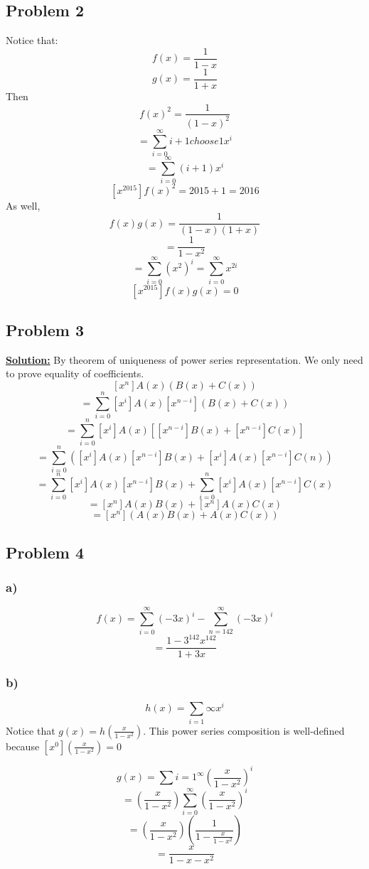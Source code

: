 \documentclass[12pt]{article}
\newcommand{\myt}[1]{\textbf{\underline{#1}}}
\begin{document}
	\subsection*{Problem 2}
	
	Notice that:
	$$f(x) = \frac{1}{1-x}$$
	$$g(x) = \frac{1}{1+x}$$
	Then 
	$$f(x)^2 = \frac{1}{(1-x)^2}$$
	$$= \sum_{i=0}^{\infty}{i+1 choose 1}x^i$$
	$$= \sum_{i=0}^{\infty}(i+1)x^i$$
	$$[x^{2015}]f(x)^2=2015+1 = 2016$$
	As well,
	$$f(x)g(x) = \frac{1}{(1-x)(1+x)}$$
	$$= \frac{1}{1-x^2}$$
	$$= \sum_{i=0}^{\infty}(x^2)^i = \sum_{i=0}^{\infty}x^{2i}$$
	$$[x^{2015}]f(x)g(x) = 0$$
	
	\subsection*{Problem 3}
	
	\myt{Solution:} By theorem of uniqueness of power series representation. We only need to prove equality of coefficients.\\
	
	$$[x^n]A(x)(B(x) + C(x))$$
	$$= \sum_{i=0}^{n}[x^i]A(x)[x^{n-i}](B(x) + C(x))$$
	$$= \sum_{i=0}^{n}[x^i]A(x)[[x^{n-i}]B(x) + [x^{n-i}]C(x)]$$
	$$= \sum_{i=0}^{n}([x^i]A(x)[x^{n-i}]B(x) + [x^i]A(x)[x^{n-i}]C(n))$$
	$$= \sum_{i=0}^{n}[x^i]A(x)[x^{n-i}]B(x) + \sum_{i=0}^{n}[x^i]A(x)[x^{n-i}]C(x)$$
	$$= [x^n]A(x)B(x) + [x^n]A(x)C(x)$$
	$$= [x^n](A(x)B(x) + A(x)C(x))$$
	
	\subsection*{Problem 4}
	\subsubsection*{a)}
	$$f(x) = \sum_{i=0}^{\infty}(-3x)^i - \sum_{n=142}^{\infty}(-3x)^i$$
	$$= \frac{1-3^{142}x^{142}}{1+3x}$$
	
	\subsubsection*{b)}
	$$h(x) = \sum_{i=1}{\infty}x^i$$
	Notice that $g(x) = h(\frac{x}{1-x^2})$. This power series composition is well-defined because $[x^0](\frac{x}{1-x^2}) = 0$
	
	$$g(x) = \sum{i=1}^{\infty}(\frac{x}{1-x^2})^i$$
	$$= (\frac{x}{1-x^2})\sum_{i=0}^{\infty}(\frac{x}{1-x^2})^i$$
	$$= (\frac{x}{1-x^2})(\frac{1}{1-\frac{x}{1-x^2}})$$
	$$= \frac{x}{1-x-x^2}$$
	
\end{document}
